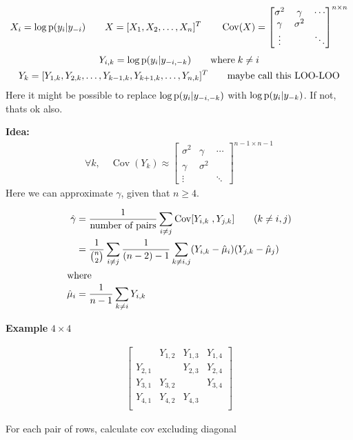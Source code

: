 \documentclass[a4paper, fleqn]{article}
\let\originalleft\left
\let\originalright\right
\renewcommand{\left}{\mathopen{}\mathclose\bgroup\originalleft}
\renewcommand{\right}{\aftergroup\egroup\originalright}
\begin{document}
\begin{gather}
X_i = \log \operatorname{p}\left( y_i \middle| y_{-i} \right) \qquad
X = [X_1, X_2, \dots, X_n]^T \qquad
\operatorname{Cov}(X) =
\begin{bmatrix}
    \sigma^2 & \gamma   &  \cdots \\
    \gamma   & \sigma^2 &  \\
    \vdots    &          & \ddots
\end{bmatrix}^{n \times n}
\end{gather}
\begin{gather}
Y_{i,k} = \log \operatorname{p}\left( y_i \middle| y_{-i,-k} \right) \qquad \text{where} \; k \neq i\\
Y_k = [Y_{1,k}, Y_{2,k}, \dots, Y_{k-1,k}, Y_{k+1,k}, \dots, Y_{n,k}]^T
\qquad \text{maybe call this LOO-LOO}
\end{gather}
Here it might be possible to replace $\log \operatorname{p}\left( y_i \middle| y_{-i,-k} \right)$ with $\log \operatorname{p}\left( y_i \middle| y_{-k} \right)$.
If not, thats ok also.

\textbf{Idea:}
\begin{gather}
\forall k, \quad \operatorname{Cov}(Y_k) \approx
\begin{bmatrix}
    \sigma^2 & \gamma   &  \cdots \\
    \gamma   & \sigma^2 &  \\
    \vdots    &          & \ddots
\end{bmatrix}^{n-1 \times n-1}
\end{gather}
Here we can approximate $\gamma$, given that $n \geq 4$.

\begin{align}
\hat{\gamma}
&= \frac{1}{\text{number of pairs}} \sum_{i \neq j}
\operatorname{Cov}\left[ Y_{i,k} \; , Y_{j,k} \right]
\qquad (k \neq i,j) \\
&= \frac{1}{\binom{n}{2}} \sum_{i \neq j}
\frac{1}{(n-2)-1} \sum_{k \neq i,j}
\left( Y_{i,k} - \hat{\mu}_i \right)
\left( Y_{j,k} - \hat{\mu}_j \right) \\
\intertext{where}
\hat{\mu}_i &= \frac{1}{n-1}\sum_{k\neq i}Y_{i,k}
\end{align}

\textbf{Example} $4 \times 4$

\begin{gather}
\begin{bmatrix}
            & Y_{1,2} & Y_{1,3} & Y_{1,4} \\
    Y_{2,1} &         & Y_{2,3} & Y_{2,4} \\
    Y_{3,1} & Y_{3,2} &         & Y_{3,4} \\
    Y_{4,1} & Y_{4,2} & Y_{4,3} &         \\
\end{bmatrix}
\end{gather}

For each pair of rows, calculate cov excluding diagonal
\end{document}
